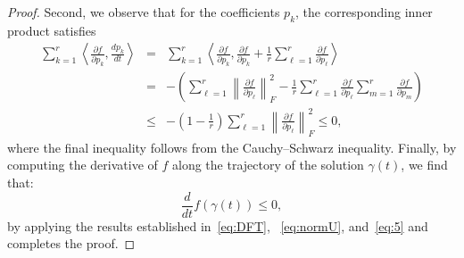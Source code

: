 \documentclass[onefignum,onetabnum]{siamart220329}
\begin{document}
\begin{proof}
    Second, we observe that for the coefficients $p_k$, the corresponding inner product satisfies  
    \begin{eqnarray}\label{eq:5}  
    \sum_{k=1}^r \left\langle \frac{\partial f}{\partial p_k}, \frac{d p_k}{dt} \right\rangle  
      &=&  
      \sum_{k=1}^r \left\langle \frac{\partial f}{\partial p_k},  
    \frac{\partial f}{\partial p_k} + \frac{1}{r} \sum_{\ell=1}^r \frac{\partial f}{\partial p_\ell}  
      \right\rangle \nonumber\\  
      &=& -\left(\sum_{\ell=1}^r 
      \left\|\frac{\partial f}{\partial p_\ell}\right\|_F^2  - \frac{1}{r} \sum_{\ell=1}^r \frac{\partial f}{\partial p_\ell} \sum_{m=1}^r \frac{\partial f}{\partial p_m} \right) \nonumber\\  
      &\leq& -\left(1 - \frac{1}{r}\right)\sum_{\ell=1}^r \left\|\frac{\partial f}{\partial p_\ell}\right\|_F^2 
      \leq 0,  
    \end{eqnarray}  
    where the final inequality follows from the Cauchy–Schwarz inequality. 
    Finally, by computing the derivative of $f$ along the trajectory of the solution $\gamma(t)$, we find that:
    \begin{equation*}
    \frac{d}{dt} f(\gamma(t)) \leq 0, 
    \end{equation*}
    by applying the results established in~\eqref{eq:DFT}, ~\eqref{eq:normU}, and~\eqref{eq:5} and completes the proof.
    \end{proof}
    
\end{document}
